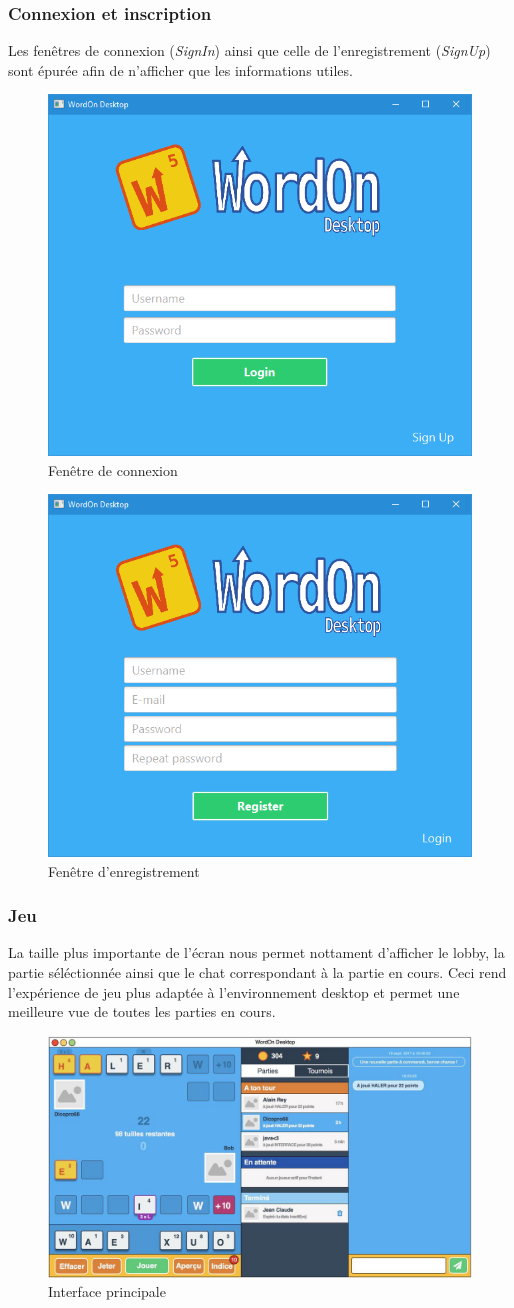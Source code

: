 \documentclass[a4paper,12pt]{article}
\begin{document}
		\subsubsection{Connexion et inscription}
		Les fenêtres de connexion (\textit{SignIn}) ainsi que celle de l'enregistrement (\textit{SignUp}) sont épurée afin de n'afficher que les informations utiles.
		
		\begin{figure}[h]
			\centering
			\includegraphics[width=0.4\linewidth]{img/signin.jpg}
			\caption{Fenêtre de connexion}
		\end{figure}
	
		\begin{figure}[h]
			\centering
			\includegraphics[width=0.4\linewidth]{img/signup.jpg}
			\caption{Fenêtre d'enregistrement}
		\end{figure}
		
		\subsubsection{Jeu}
		La taille plus importante de l'écran nous permet nottament d'afficher le lobby, la partie séléctionnée ainsi que le chat correspondant à la partie en cours. Ceci rend l'expérience de jeu plus adaptée à l'environnement desktop et permet une meilleure vue de toutes les parties en cours.
		
		\begin{figure}[h]
			\centering
			\includegraphics[width=0.6\linewidth]{img/main.jpg}
			\caption{Interface principale}
		\end{figure}
		
\end{document}

